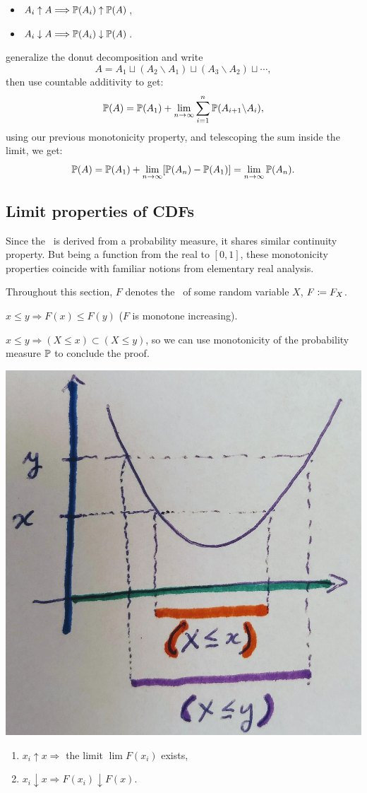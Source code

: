 \documentclass{article}
\begin{document}
\begin{itemize}
  \item $A_i \uparrow A \Longrightarrow \P(A_i) \uparrow \P(A)$,
  \item $A_i \downarrow A \Longrightarrow \P(A_i) \downarrow \P(A)$.
\end{itemize}

 generalize the donut decomposition and write 
\[ A = A_1 \sqcup (A_2 \backslash A_1) \sqcup (A_3 \backslash A_2) \sqcup \cdots, \]
then use countable additivity to get:
\[ \P(A) = \P(A_1) + \lim_{n \to \infty} \sum_{i=1}^n \P(A_{i+1} \backslash A_i), \]
using our previous monotonicity property, and telescoping the sum inside the limit, we get:
\[ \P(A) = \P(A_1) + \lim_{n \to \infty} [\P(A_n) - \P(A_1)] = \lim_{n\to\infty} \P(A_n). \]


\subsection{Limit properties of CDFs}\label{sec:limit-properties-cdfs}

Since the \CDF\ is derived from a probability measure, it shares similar continuity property. But being a function from the real to $[0,1]$, these monotonicity properties coincide with familiar notions from elementary real analysis. 

 Throughout this section, $F$ denotes the \CDF\ of some random variable $X$, $F \defeq F_X$.

 $x \le y \Longrightarrow F(x) \le F(y)$ ($F$ is monotone increasing).

 $x \le y \Longrightarrow (X \le x) \subset (X \le y)$, so we can use monotonicity of the probability measure $\P$ to conclude the proof.
\begin{center}
	\includegraphics[width=0.3\linewidth]{figures/inclusion}
\end{center}

\begin{enumerate}
  \item \label{item:cont1} $x_i \uparrow x \Longrightarrow$ the limit $\lim F(x_i)$ exists,
  \item \label{item:cont2} $x_i \downarrow x \Longrightarrow F(x_i) \downarrow F(x)$.
\end{enumerate}
\end{document}
